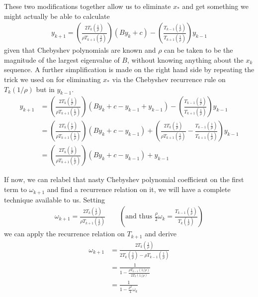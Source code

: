 \documentclass[11pt]{article}
\begin{document}
These two modifications together allow us to eliminate $x_*$ and get something we might actually be able to calculate \begin{gather*}
y_{k+1} = \left( \frac{2 T_k\left(\frac1\rho\right) }{\rho T_{k+1}\left(\frac1\rho\right) } \right) (B y_k + c) - \left( \frac{T_{k-1} \left(\frac1\rho \right)}{T_{k+1}\left(\frac1\rho\right)} \right) y_{k-1}
\end{gather*}
given that Chebyshev polynomials are known and $\rho$ can be taken to be the magnitude of the largest eigenvalue of $B$, without knowing anything about the $x_k$ sequence. A further simplification is made on the right hand side by repeating the trick we used on for eliminating $x_*$ via the Chebyshev recurrence rule on $T_k(1/\rho)$ but in $y_{k-1}$. \begin{align*}
y_{k+1} &= \left( \frac{2 T_k\left(\frac1\rho\right) }{\rho T_{k+1}\left(\frac1\rho\right) } \right) (B y_k + c - y_{k-1} + y_{k-1}) - \left( \frac{T_{k-1} \left(\frac1\rho \right)}{T_{k+1}\left(\frac1\rho\right)} \right) y_{k-1} \\
&= \left( \frac{2 T_k\left(\frac1\rho\right) }{\rho T_{k+1}\left(\frac1\rho\right) } \right) (B y_k  + c - y_{k-1}) + \left( \frac{2 T_k\left(\frac1\rho\right) }{\rho T_{k+1}\left(\frac1\rho\right) } - \frac{T_{k-1} \left(\frac1\rho \right)}{T_{k+1}\left(\frac1\rho\right)} \right) y_{k-1} \\
&= \left( \frac{2 T_k\left(\frac1\rho\right) }{\rho T_{k+1}\left(\frac1\rho\right) } \right) (B y_k + c - y_{k-1}) + y_{k-1}
\end{align*}

If now, we can relabel that nasty Chebyshev polynomial coefficient on the first term to $\omega_{k+1}$ and find a recurrence relation on it, we will have a complete technique available to us. Setting \begin{gather*}
\omega_{k+1} = \frac{2 T_k\left(\frac1\rho\right) }{\rho T_{k+1}\left(\frac1\rho\right) } \hspace{2em} \left( \text{and thus } \frac{\rho}{2} \omega_k =\frac{T_{k-1}\left(\frac1\rho\right) }{T_{k}\left(\frac1\rho\right) } \right)
\end{gather*}
we can apply the recurrence relation on $T_{k+1}$ and derive \begin{align*}
\omega_{k+1} &= \frac{2 T_k\left(\frac1\rho\right) }{2 T_{k}\left(\frac1\rho\right) - \rho T_{k-1} \left(\frac1\rho\right)} \\
&= \frac{1 }{1 - \frac{\rho T_{k-1} (1/\rho)}{2 T_{k}(1/\rho)}} \\
&= \frac{1}{1 - \frac{\rho^2}{4}\omega_k}
\end{align*}
\end{document}
